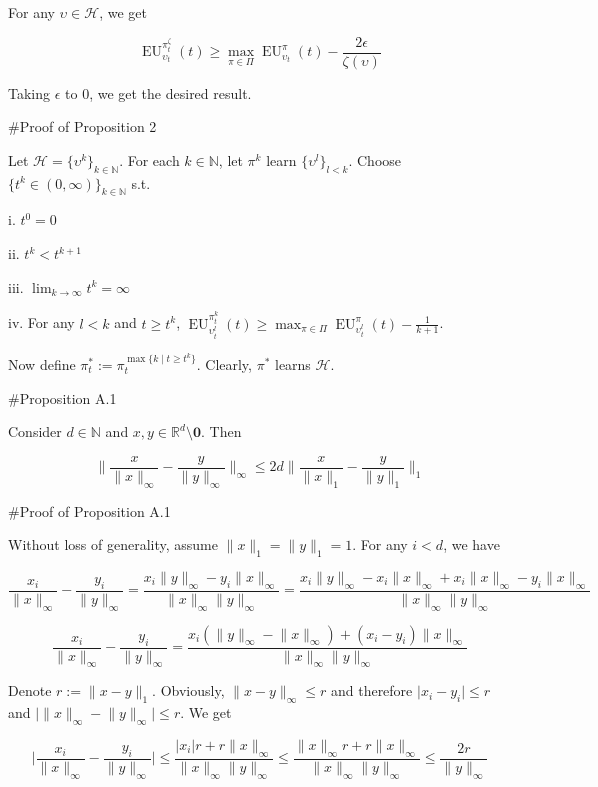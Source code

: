 \documentclass[a4paper]{article}
\newcommand{\Nats}{\mathbb{N}}
\newcommand{\Reals}{\mathbb{R}}
\newcommand{\Abs}[1]{\lvert #1 \rvert}
\newcommand{\Norm}[1]{\lVert #1 \rVert}
\newcommand{\Hy}{\mathcal{H}}
\newcommand{\EU}{\operatorname{EU}}
\begin{document}
For any $\upsilon \in \Hy$, we get

$$\EU_{\upsilon_t}^{\pi^\zeta_t}(t) \geq \max_{\pi \in \Pi} \EU_{\upsilon_t}^{\pi}(t) - \frac{2\epsilon}{\zeta(\upsilon)}$$

Taking $\epsilon$ to 0, we get the desired result.

\#Proof of Proposition 2

Let $\Hy = \{\upsilon^k\}_{k \in \Nats}$. For each $k \in \Nats$, let $\pi^k$ learn $\{\upsilon^l\}_{l < k}$. Choose $\{t^k \in (0,\infty)\}_{k \in \Nats}$ s.t.

i. $t^0 = 0$

ii. $t^k < t^{k+1}$

iii. $\lim_{k \rightarrow \infty} t^k = \infty$

iv. For any $l < k$ and $t \geq t^k$, $\EU_{\upsilon^l_t}^{\pi^k_t}(t) \geq \max_{\pi \in \Pi} \EU_{\upsilon^l_t}^\pi(t) - \frac{1}{k+1}$.

Now define $\pi^*_t:=\pi_t^{\max\{k \mid t \geq t^k\}}$. Clearly, $\pi^*$ learns $\Hy$.

\#Proposition A.1

Consider $d \in \Nats$ and $x,y \in \Reals^d \setminus \boldsymbol{0}$. Then

$$\Norm{\frac{x}{\Norm{x}_\infty}-\frac{y}{\Norm{y}_\infty}}_\infty \leq2d \Norm{\frac{x}{\Norm{x}_1}-\frac{y}{\Norm{y}_1}}_1$$

\#Proof of Proposition A.1

Without loss of generality, assume $\Norm{x}_1 = \Norm{y}_1 = 1$. For any $i < d$, we have

$$\frac{x_i}{\Norm{x}_\infty} - \frac{y_i}{\Norm{y}_\infty} = \frac{x_i\Norm{y}_\infty-y_i\Norm{x}_\infty}{\Norm{x}_\infty\Norm{y}_\infty} = \frac{x_i\Norm{y}_\infty - x_i\Norm{x}_\infty + x_i\Norm{x}_\infty - y_i\Norm{x}_\infty}{\Norm{x}_\infty\Norm{y}_\infty}$$

$$\frac{x_i}{\Norm{x}_\infty} - \frac{y_i}{\Norm{y}_\infty} = \frac{x_i(\Norm{y}_\infty - \Norm{x}_\infty) + (x_i - y_i)\Norm{x}_\infty}{\Norm{x}_\infty\Norm{y}_\infty}$$

Denote $r:=\Norm{x-y}_1$. Obviously, $\Norm{x-y}_\infty \leq r$ and therefore $\Abs{x_i-y_i} \leq r$ and $\Abs{\Norm{x}_\infty - \Norm{y}_\infty} \leq r$. We get

$$\Abs{\frac{x_i}{\Norm{x}_\infty} - \frac{y_i}{\Norm{y}_\infty}} \leq \frac{\Abs{x_i}r + r\Norm{x}_\infty}{\Norm{x}_\infty\Norm{y}_\infty} \leq \frac{\Norm{x}_\infty r + r\Norm{x}_\infty}{\Norm{x}_\infty\Norm{y}_\infty} \leq \frac{2r}{\Norm{y}_\infty}$$
\end{document}
